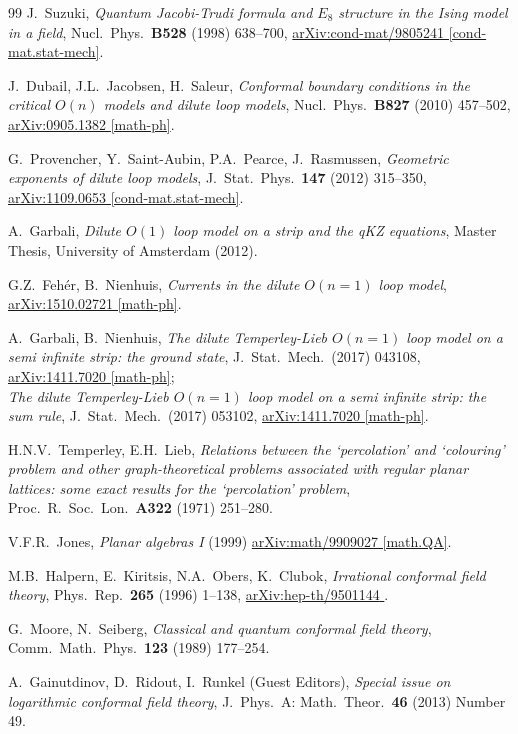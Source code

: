 \documentclass[11pt]{article}
\numberwithin{equation}{section}
\theoremstyle{plain}
\numberwithin{equation}{section}
\def\arxiv#1#2{\href{http://arxiv.org/abs/#1}{\textsf{arXiv:#1 #2}}}
\begin{document}
\begin{thebibliography}{99}
J.~Suzuki, 
{\em Quantum Jacobi-Trudi formula and $E_8$ structure in the Ising model in a field}, 
Nucl.~Phys.~{\bf B528} (1998) 638--700,
\arxiv{cond-mat/9805241}{[cond-mat.stat-mech]}.

J.~Dubail, J.L.~Jacobsen, H.~Saleur, 
{\em Conformal boundary conditions in the critical $O(n)$ models and dilute loop models}, 
Nucl.~Phys.~{\bf B827} (2010) 457--502,
\arxiv{0905.1382}{[math-ph]}.

G.~Provencher, Y.~Saint-Aubin, P.A.~Pearce, J.~Rasmussen, 
{\em Geometric exponents of dilute loop models}, 
J.~Stat.~Phys.~{\bf 147} (2012) 315--350,
\arxiv{1109.0653}{[cond-mat.stat-mech]}.

A.~Garbali,
{\em Dilute $O(1)$ loop model on a strip and the qKZ equations},	
Master Thesis, University of Amsterdam (2012).

G.Z.~Feh\'er, B.~Nienhuis,
{\em Currents in the dilute $O(n\!=\!1)$ loop model}, 
\arxiv{1510.02721}{[math-ph]}.

A.~Garbali, B.~Nienhuis,
{\em The dilute Temperley-Lieb $O(n\!=\!1)$ loop model on a semi infinite strip: the ground state}, 
J.~Stat.~Mech.~(2017) 043108, 
\arxiv{1411.7020}{[math-ph]};\\
{\em The dilute Temperley-Lieb $O(n\!=\!1)$ loop model on a semi infinite strip: the sum rule}, 
J.~Stat.~Mech.~(2017) 053102,
\arxiv{1411.7020}{[math-ph]}.

 H.N.V.~Temperley, E.H.~Lieb,
{\it Relations between the `percolation' and `colouring' problem and other graph-theoretical problems associated with regular planar lattices: some exact results for the `percolation' problem}, 
Proc.~R.~Soc.~Lon.~{\bf A322} (1971) 251--280.

V.F.R.~Jones, 
{\em Planar algebras I} (1999) \arxiv{math/9909027}{[math.QA]}.

M.B.~Halpern, E.~Kiritsis, N.A.~Obers, K.~Clubok, 
{\em Irrational conformal field theory}, 
Phys.~Rep.~{\bf 265} (1996) 1--138,
\arxiv{hep-th/9501144}{\!\!}.

G.~Moore, N.~Seiberg, 
{\em Classical and quantum conformal field theory}, 
Comm.~Math.~Phys.~{\bf 123} (1989) 177--254.

A.~Gainutdinov, D.~Ridout, I.~Runkel (Guest Editors),
{\em Special issue on logarithmic conformal field theory}, 
J.~Phys.~A: Math.~Theor.~{\bf 46} (2013) Number 49.


\end{thebibliography}
\end{document}
